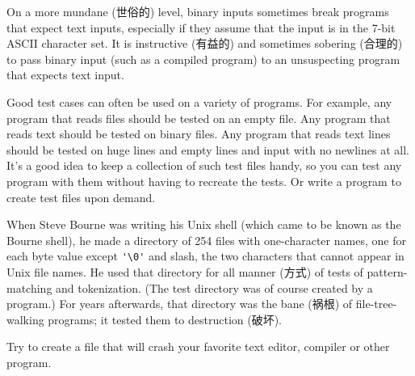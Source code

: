 On a more mundane (世俗的) level, binary inputs sometimes break programs
that expect text inputs, especially if they assume that the input is in the
7-bit ASCII character set.  It is instructive (有益的) and sometimes
sobering (合理的) to pass binary input (such as a compiled program) to an
unsuspecting program that expects text input.

Good test cases can often be used on a variety of programs. For example,
any program that reads files should be tested on an empty file. Any program
that reads text should be tested on binary files. Any program that reads
text lines should be tested on huge lines and empty lines and input with no
newlines at all. It's a good idea to keep a collection of such test files
handy, so you can test any program with them without having to recreate the
tests. Or write a program to create test files upon demand.

When Steve Bourne was writing his Unix shell (which came to be known as the
Bourne shell), he made a directory of 254 files with one-character names,
one for each byte value except \verb"'\0'" and slash, the two characters
that cannot appear in Unix file names. He used that directory for all
manner (方式) of tests of pattern-matching and tokenization. (The test
directory was of course created by a program.) For years afterwards, that
directory was the bane (祸根) of file-tree-walking programs; it tested them
to destruction (破坏).

\begin{exercise}
    Try to create a file that will crash your favorite text editor,
    compiler or other program.
\end{exercise}
